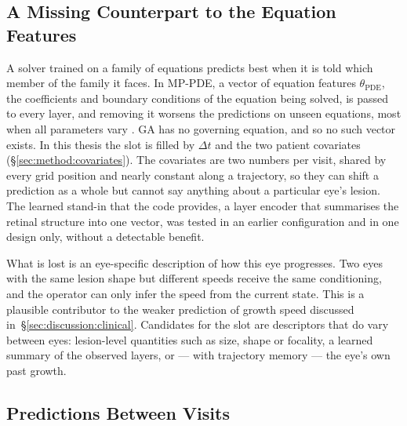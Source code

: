\subsection{A Missing Counterpart to the Equation Features}
\label{sec:discussion:equation-features}

A solver trained on a family of equations predicts best when it is told
which member of the family it faces. In MP-PDE, a vector of equation
features $\theta_{\text{PDE}}$, the coefficients and boundary conditions of
the equation being solved, is passed to every layer, and removing it
worsens the predictions on unseen equations, most when all parameters vary
\citep{Brandstetter2022}. GA has no governing
equation, and so no such vector exists. In this thesis the slot is filled
by $\Delta t$ and the two patient covariates (\S\ref{sec:method:covariates}).
The covariates are two numbers per visit, shared by every grid position
and nearly constant along a trajectory, so they can shift a prediction as
a whole but cannot say anything about a particular eye's lesion. The
learned stand-in that the code provides, a layer encoder that summarises
the retinal structure into one vector, was tested in an earlier
configuration and in one design only, without a detectable benefit.

What is lost is an eye-specific description of how this eye progresses.
Two eyes with the same lesion shape but different speeds receive the same
conditioning, and the operator can only infer the speed from the current
state. This is a plausible contributor to the weaker prediction of growth
speed discussed in~\S\ref{sec:discussion:clinical}.
Candidates for the slot are descriptors that do vary between eyes:
lesion-level quantities such as size, shape or focality, a learned summary
of the observed layers, or --- with trajectory memory --- the eye's own
past growth.

\subsection{Predictions Between Visits}
\label{sec:discussion:between-visits}

